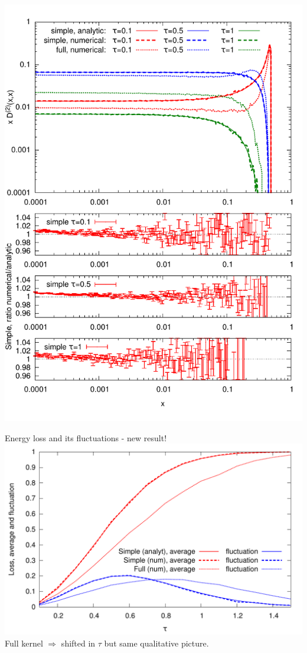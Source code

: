 \documentclass[pstricks,mathserif]{beamer}
\begin{document}
\begin{frame}
\includegraphics[width=1\linewidth]{D2.pdf}
\endminipage\hfill


\end{frame}



\begin{frame}
Energy loss and its fluctuations - new result!
{\centering
\includegraphics[width=1\linewidth]{energyloss.pdf}
}
Full kernel $\Rightarrow$ shifted in $\tau$ but same qualitative picture.
\end{frame}
\end{document}
